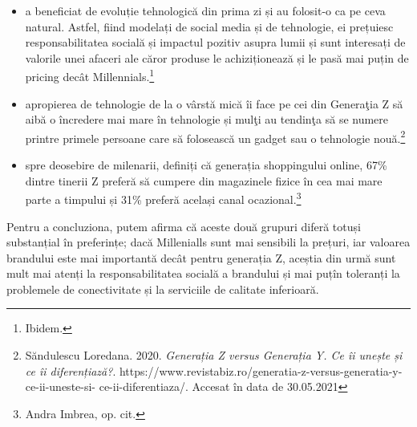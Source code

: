 \documentclass[a4paper, 12pt]{article}
\begin{document}
		\begin{itemize}
			\item a beneficiat de evoluție tehnologică din prima zi și au folosit-o ca pe ceva natural. Astfel, fiind modelați de social media și de tehnologie, ei prețuiesc responsabilitatea socială și impactul pozitiv asupra lumii și sunt interesați de valorile unei afaceri ale căror produse le achiziționează și le pasă mai puțin de pricing decât Millennials.\footnote{Ibidem.}
			\item apropierea de tehnologie de la o vârstă mică îi face pe cei din Generaţia Z să aibă o încredere mai mare în tehnologie și mulţi au tendinţa să se numere printre primele persoane care să folosească un gadget sau o tehnologie nouă.\footnote{Săndulescu Loredana. 2020. \textit{Generația Z versus Generația Y. Ce îi unește și ce îi diferențiază?}. https://www.revistabiz.ro/generatia-z-versus-generatia-y-ce-ii-uneste-si- ce-ii-diferentiaza/. Accesat în data de 30.05.2021 }
			\item spre deosebire de milenarii, definiți că generația shoppingului online, 67\% dintre tinerii Z preferă să cumpere din magazinele fizice în cea mai mare parte a timpului și 31\% preferă același canal ocazional.\footnote{Andra Imbrea, op. cit.}
		\end{itemize}	
			
		 \quad Pentru a concluziona, putem afirma că aceste două grupuri diferă totuși substanțial în preferințe; dacă Millenialls sunt mai sensibili la prețuri, iar valoarea brandului este mai importantă decât pentru generația Z, aceștia din urmă sunt mult mai atenți la responsabilitatea socială a brandului și mai puțîn toleranți la problemele de conectivitate și la serviciile de calitate inferioară.
	\newpage
\end{document}
